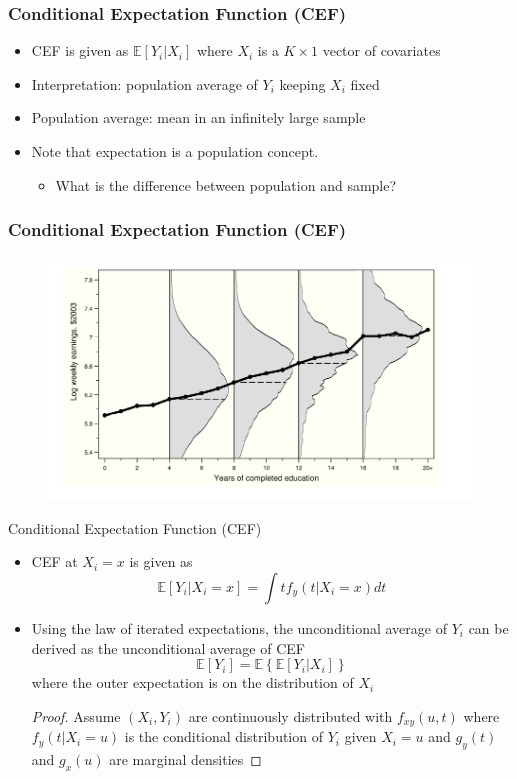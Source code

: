 \documentclass{beamer}
\theoremstyle{plain}
\begin{document}
\begin{frame}
	\frametitle{Conditional Expectation Function (CEF)}
	\begin{itemize}
		\item CEF is given as $\mathbb E[Y_i | X_i]$ where $X_i$ is a $K \times 1$ vector of covariates
		\item Interpretation: population average of $Y_i$ keeping $X_i$ fixed
		\item Population average: mean in an infinitely large sample
		\item Note that expectation is a population concept.
		\begin{itemize}
			\item What is the difference between population and sample?
		\end{itemize}
	\end{itemize}
\end{frame}

\begin{frame}
	\frametitle{Conditional Expectation Function (CEF)}
	\begin{figure}
		\centering
		\includegraphics[width=\linewidth]{figures/mhe_fig_311}
	\end{figure}
\end{frame}

\begin{frame}{Conditional Expectation Function (CEF)}
	\begin{itemize}
		\item CEF at $X_i = x$ is given as
		$$\mathbb E[Y_i | X_i = x] = \int t f_y(t | X_i = x) dt $$
		\item Using the law of iterated expectations, the unconditional average of $Y_i$ can be derived as the unconditional average of CEF
		$$\mathbb E[Y_i] = \mathbb E\left\{ \mathbb E[Y_i | X_i]  \right\} $$
		where the outer expectation is on the distribution of $X_i$
		\begin{proof}
			Assume $(X_i, Y_i)$ are continuously distributed with $f_{xy}(u,t)$ where $f_y(t | X_i = u)$ is the conditional distribution of $Y_i$ given $X_i = u$ and $g_y(t)$ and $g_x(u)$ are marginal densities
		\end{proof}
	\end{itemize}
\end{frame}
\end{document}
